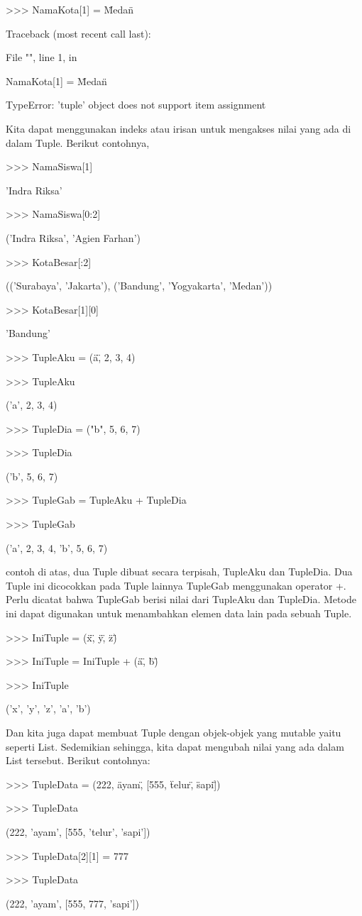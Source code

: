 >>> NamaKota[1] = \"Medan\" \par
Traceback (most recent call last): \par
File "", line 1, in \par
NamaKota[1] = \"Medan\" \par

TypeError: 'tuple' object does not support item assignment \par

Kita dapat menggunakan indeks atau irisan untuk mengakses nilai yang ada di dalam Tuple. Berikut contohnya, \par

>>> NamaSiswa[1] \par
'Indra Riksa' \par
>>> NamaSiswa[0:2] \par
('Indra Riksa', 'Agien Farhan') \par
>>> KotaBesar[:2] \par
(('Surabaya', 'Jakarta'), ('Bandung', 'Yogyakarta', 'Medan')) \par
>>> KotaBesar[1][0] \par
'Bandung' \par

>>> TupleAku = (\"a\", 2, 3, 4) \par
>>> TupleAku \par
('a', 2, 3, 4) \par
>>> TupleDia = ("b", 5, 6, 7) \par
>>> TupleDia \par
('b', 5, 6, 7) \par
>>> TupleGab = TupleAku + TupleDia \par
>>> TupleGab \par
('a', 2, 3, 4, 'b', 5, 6, 7) \par
contoh di atas, dua Tuple dibuat secara terpisah, TupleAku dan TupleDia. Dua Tuple ini dicocokkan pada Tuple lainnya TupleGab menggunakan operator +. Perlu dicatat bahwa TupleGab berisi nilai dari TupleAku dan TupleDia. Metode ini dapat digunakan untuk menambahkan elemen data lain pada sebuah Tuple. \par
>>> IniTuple = (\"x\", \"y\", \"z\") \par
>>> IniTuple = IniTuple + (\"a\", \"b\") \par
>>> IniTuple \par
('x', 'y', 'z', 'a', 'b') \par

Dan kita juga dapat membuat Tuple dengan objek-objek yang mutable yaitu seperti List. Sedemikian sehingga, kita dapat mengubah nilai yang ada dalam List tersebut. Berikut contohnya: \par
>>> TupleData = (222, \"ayam\", [555, \"telur\", \"sapi\"]) \par
>>> TupleData \par
(222, 'ayam', [555, 'telur', 'sapi']) \par
>>> TupleData[2][1] = 777 \par
>>> TupleData \par
(222, 'ayam', [555, 777, 'sapi']) \par

